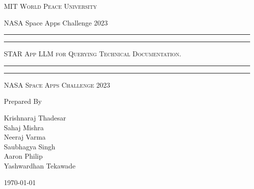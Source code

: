\documentclass[11pt]{article}
\begin{document}
\begin{titlepage}
	\centering


	\huge\textsc{
		MIT World Peace University
	}\\

	\vspace{0.75\baselineskip} %

	\LARGE{
		NASA Space Apps Challenge 2023
	}

	\vfill %


	\rule{\textwidth}{1.6pt}\vspace*{-\baselineskip}\vspace*{2pt}
	\rule{\textwidth}{0.6pt}
	\vspace{0.75\baselineskip} %



	\huge{\textsc{
			STAR App LLM for Querying Technical Documentation.
		}} \\


	\vspace{0.5\baselineskip} %
	\rule{\textwidth}{0.6pt}\vspace*{-\baselineskip}\vspace*{2.8pt}
	\rule{\textwidth}{1.6pt}

	\vspace{1\baselineskip} %


	\LARGE\textsc{
		NASA Space Apps Challenge 2023
	} %
	\vfill


	Prepared By
	\vspace{0.5\baselineskip} %

	\Large{
		Krishnaraj Thadesar \\
		Sahaj Mishra \\
		Neeraj Varma  \\
		Saubhagya Singh \\
		Aaron Philip \\
		Yashwardhan Tekawade \\
	}


	\vspace{0.5\baselineskip} %
	\today

\end{titlepage}
\end{document}
